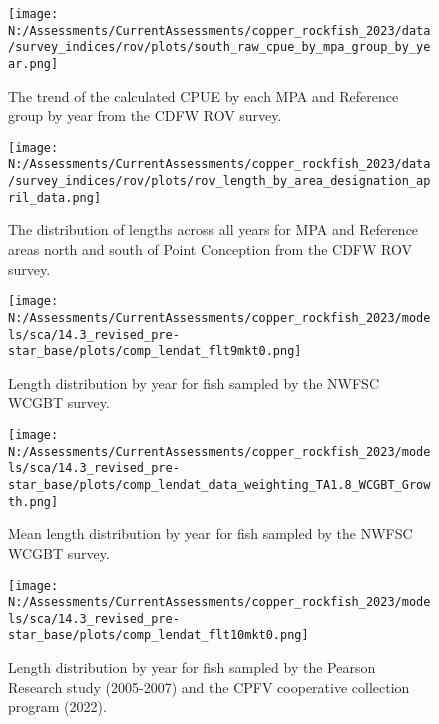 \documentclass[11pt,
  english,
  letterpaper,
]{article}
\begin{document}
\pagebreak

\begin{figure}
\centering
\texttt{[image: N:/Assessments/CurrentAssessments/copper\_rockfish\_2023/data/survey\_indices/rov/plots/south\_raw\_cpue\_by\_mpa\_group\_by\_year.png]}
\caption{The trend of the calculated CPUE by each MPA and Reference group by year from the CDFW ROV survey.\label{fig:rov-raw-cpue}}
\end{figure}

\pagebreak

\begin{figure}
\centering
\texttt{[image: N:/Assessments/CurrentAssessments/copper\_rockfish\_2023/data/survey\_indices/rov/plots/rov\_length\_by\_area\_designation\_april\_data.png]}
\caption{The distribution of lengths across all years for MPA and Reference areas north and south of Point Conception from the CDFW ROV survey.\label{fig:rov-len}}
\end{figure}

\pagebreak

\pagebreak

\pagebreak

\begin{figure}
\centering
\texttt{[image: N:/Assessments/CurrentAssessments/copper\_rockfish\_2023/models/sca/14.3\_revised\_pre-star\_base/plots/comp\_lendat\_flt9mkt0.png]}
\caption{Length distribution by year for fish sampled by the NWFSC WCGBT survey.\label{fig:growth-wcgbt-len}}
\end{figure}

\pagebreak

\begin{figure}
\centering
\texttt{[image: N:/Assessments/CurrentAssessments/copper\_rockfish\_2023/models/sca/14.3\_revised\_pre-star\_base/plots/comp\_lendat\_data\_weighting\_TA1.8\_WCGBT\_Growth.png]}
\caption{Mean length distribution by year for fish sampled by the NWFSC WCGBT survey.\label{fig:growth-mean-wcgbt-len}}
\end{figure}

\pagebreak

\begin{figure}
\centering
\texttt{[image: N:/Assessments/CurrentAssessments/copper\_rockfish\_2023/models/sca/14.3\_revised\_pre-star\_base/plots/comp\_lendat\_flt10mkt0.png]}
\caption{Length distribution by year for fish sampled by the Pearson Research study (2005-2007) and the CPFV cooperative collection program (2022).\label{fig:growth-coop-len}}
\end{figure}
\end{document}
